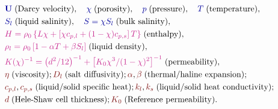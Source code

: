 \documentclass[landscape,24pt, a0paper,colspace=10mm,blockverticalspace=12mm]{tikzposter}
\newcommand{\varColor}[1]{\textcolor{dukeblue}{#1}}
\newcommand{\eqnColor}[1]{\textcolor{royalfuchsia}{#1}}
\newcommand{\paramColor}[1]{\textcolor{falured}{#1}}
\begin{document}
\begin{columns}
{\begin{minipage}[t]{0.49\linewidth}
\begin{align}
\end{align} 
\end{minipage}
\hfill
\begin{minipage}[t][][b]{0.48\linewidth}
\vspace{-1.75\baselineskip}
\begin{align*}
&\varColor{\mathbf{U}}\; \text{(Darcy velocity)}, \quad \varColor{\chi} \; \text{(porosity)}, \quad \varColor{p} \; \text{(pressure)}, \quad \varColor{T} \; \text{(temperature)},\\
&\varColor{S_l} \; \text{(liquid salinity)}, \quad \varColor{S = \chi S_l} \; \text{(bulk salinity)},  \\
&\eqnColor{H = \rho_0 \left\{ L \chi + \left[\chi c_{p,l} + (1-\chi) c_{p,s}\right] T \right\}} \; \text{(enthalpy)}, \\
&\eqnColor{\rho_l = \rho_0 \left[1 - \alpha T + \beta S_l \right]} \; \text{(liquid density)}, \\
&\eqnColor{K(\chi)^{-1} = \left(d^2/12\right)^{-1} + \left[K_0 \chi^3 / (1-\chi)^2 \right]^{-1}} \; \text{(permeability)}, \\
&\paramColor{\eta} \; \text{(viscosity)}; \paramColor{D_l} \; \text{(salt diffusivity)}; \paramColor{\alpha}, \paramColor{\beta} \; \text{(thermal/haline expansion)}; \\
&\paramColor{c_{p,l}}, \paramColor{c_{p,s}} \; \text{(liquid/solid specific heat)}; \paramColor{k_l}, \paramColor{k_s} \; \text{(liquid/solid heat conductivity)}; \\
&\paramColor{d} \; \text{(Hele-Shaw cell thickness)}; \paramColor{K_0} \; \text{(Reference permeability)}.
\end{align*}
\end{minipage}


}
\end{columns}
\end{document}
